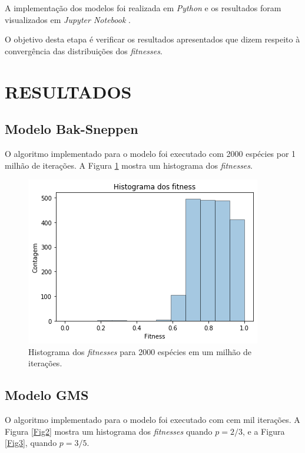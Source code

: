\documentclass[10pt,brazil,english]{article}
\begin{document}
        A implementação dos modelos foi realizada em \textit{Python} e os resultados foram visualizados em \textit{Jupyter Notebook} \cite{domingues2019jupyter}.

        O objetivo desta etapa é verificar os resultados apresentados que dizem respeito à convergência das distribuições dos \textit{fitnesses}.

    \section{RESULTADOS}

        \subsection{Modelo Bak-Sneppen}

            O algoritmo implementado para o modelo foi executado com 2000 espécies por 1 milhão de iterações.
            A Figura \ref{Fig1} mostra um histograma dos \textit{fitnesses}.

            \begin{figure}[!hbtp]
                \begin{center}
                    \includegraphics[scale=0.5]{Images/5-1.png}
                \end{center}
                \caption{Histograma dos \textit{fitnesses} para 2000 espécies em um milhão de iterações.}
                \label{Fig1}
            \end{figure}

        \subsection{Modelo GMS}

            O algoritmo implementado para o modelo foi executado com cem mil iterações.
            A Figura \ref{Fig2} mostra um histograma dos \textit{fitnesses} quando $p = 2/3$, e a Figura \ref{Fig3}, quando $p = 3/5$.
\end{document}
